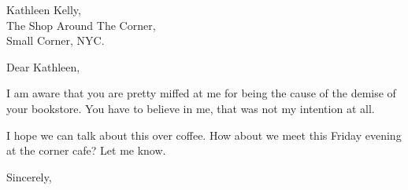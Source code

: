 \documentclass[a4paper, 10pt]{letter}
\begin{document}
\begin{letter}
{
    Kathleen Kelly,\\
    The Shop Around The Corner,\\
    Small Corner, NYC.
}

\opening{Dear Kathleen,}


I am aware that you are pretty miffed at me for being the cause of the demise of your bookstore. You have to believe in me, that was not my intention at all.

I hope we can talk about this over coffee. How about we meet this Friday evening at the corner cafe? Let me know.

\closing{Sincerely,}

\end{letter}
\end{document}
